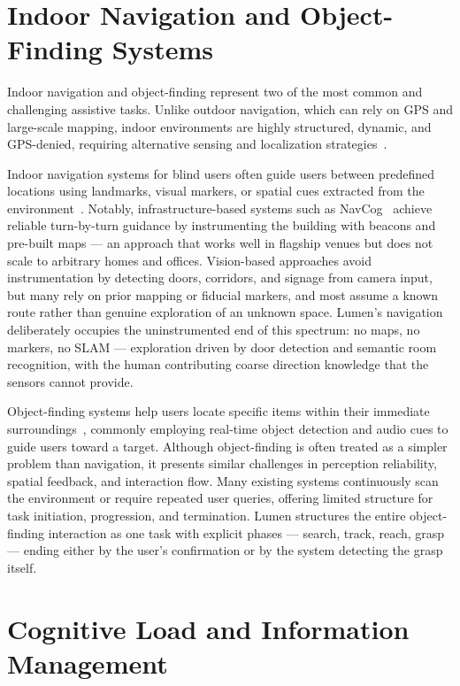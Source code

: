 \section{Indoor Navigation and Object-Finding Systems}
\label{sec:indoor_navigation_object_finding}

Indoor navigation and object-finding represent two of the most common and challenging
assistive tasks. Unlike outdoor navigation, which can rely on GPS and large-scale
mapping, indoor environments are highly structured, dynamic, and GPS-denied,
requiring alternative sensing and localization strategies~\cite{fernandes2019review}.

Indoor navigation systems for blind users often guide users between predefined
locations using landmarks, visual markers, or spatial cues extracted from the
environment~\cite{guerrero2012navigation, rodriguez2012navigation}. Notably,
infrastructure-based systems such as NavCog~\cite{ahmetovic2016navcog} achieve
reliable turn-by-turn guidance by instrumenting the building with beacons and
pre-built maps --- an approach that works well in flagship venues but does not scale
to arbitrary homes and offices. Vision-based approaches avoid instrumentation by
detecting doors, corridors, and signage from camera input, but many rely on prior
mapping or fiducial markers, and most assume a known route rather than genuine
exploration of an unknown space. Lumen's navigation deliberately occupies the
uninstrumented end of this spectrum: no maps, no markers, no SLAM --- exploration
driven by door detection and semantic room recognition, with the human contributing
coarse direction knowledge that the sensors cannot provide.

Object-finding systems help users locate specific items within their immediate
surroundings~\cite{brilhault2011object, tapu2014wearable}, commonly employing
real-time object detection and audio cues to guide users toward a target. Although
object-finding is often treated as a simpler problem than navigation, it presents
similar challenges in perception reliability, spatial feedback, and interaction flow.
Many existing systems continuously scan the environment or require repeated user
queries, offering limited structure for task initiation, progression, and
termination. Lumen structures the entire object-finding interaction as one task with
explicit phases --- search, track, reach, grasp --- ending either by the user's
confirmation or by the system detecting the grasp itself.

\section{Cognitive Load and Information Management}
\label{sec:cognitive_load}

